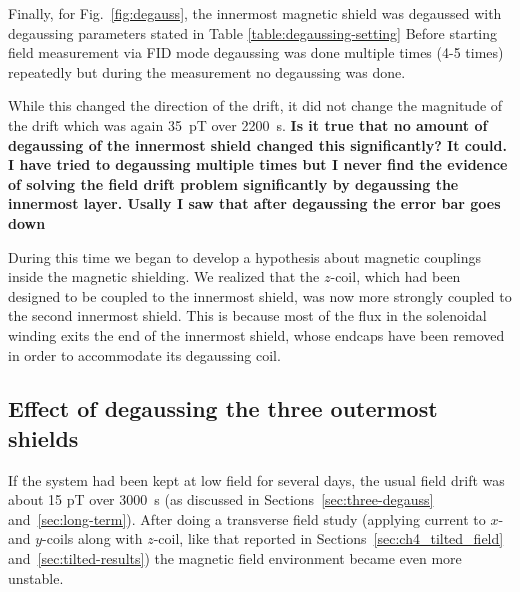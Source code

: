 Finally, for Fig.~\ref{fig:degauss}, the innermost
magnetic shield was degaussed  with degaussing parameters stated in Table \ref{table:degaussing-setting}
Before starting field measurement via FID mode degaussing was done multiple times (4-5 times) repeatedly but during the measurement no degaussing was done. 
  
  While this changed the direction of the
drift, it did not change the magnitude of the drift which was again
35~pT over 2200~s.  {\bf Is it true that no amount of degaussing of
  the innermost shield changed this significantly? It could.  I have tried to degaussing multiple times but I never find the evidence of  solving the field drift problem significantly by degaussing the innermost layer. Usally I saw that after degaussing the error bar goes down}

During this time we began to develop a hypothesis about magnetic
couplings inside the magnetic shielding.  We realized that the
$z$-coil, which had been designed to be coupled to the innermost
shield, was now more strongly coupled to the second innermost shield.
This is because most of the flux in the solenoidal winding exits the
end of the innermost shield, whose endcaps have been removed in order
to accommodate its degaussing coil.


\subsection{Effect of degaussing the three outermost shields}
 
If the system had been kept at low field for several days, the usual
field drift was about 15 pT over 3000~s (as discussed in
Sections~\ref{sec:three-degauss} and~\ref{sec:long-term}).  After
doing a transverse field study (applying current to $x$- and $y$-coils
along with $z$-coil, like that reported in
Sections~\ref{sec:ch4_tilted_field} and~\ref{sec:tilted-results}) the
magnetic field environment became even more unstable.

